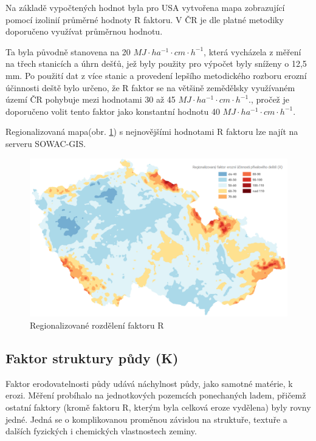 Na základě vypočtených hodnot byla pro USA vytvořena mapa zobrazující pomocí izolinií průměrné hodnoty R faktoru. \cite{usle1978} V ČR je dle platné metodiky doporučeno využívat průměrnou hodnotu.\cite{janecek2012}

Ta byla původně stanovena na 20 $MJ\cdot ha^{-1}\cdot cm \cdot h^{-1}$, která vycházela z měření na třech stanicích a úhrn dešťů, jež byly použity pro výpočet byly sníženy o 12,5 mm. Po použití dat z více stanic a provedení lepšího metodického rozboru erozní účinnosti deště bylo určeno, že R faktor se na většině zemědělsky využívaném území ČR pohybuje mezi hodnotami 30 až 45 $MJ\cdot ha^{-1}\cdot cm \cdot h^{-1}$., pročež je doporučeno volit tento faktor jako konstantní hodnotu 40 $MJ\cdot ha^{-1}\cdot cm \cdot h^{-1}$.\cite{janecek2012}

Regionalizovaná mapa(obr. \ref{fig:r_faktor}) s nejnovějšími hodnotami R faktoru lze najít na serveru SOWAC-GIS.\cite{sowac}

\begin{figure}[H]
    \centering
      \includegraphics[scale=0.5]{./pictures/r_factor.png}
      \caption{Regionalizované rozdělení faktoru R}
      \label{fig:r_faktor}
\end{figure}

\subsection{Faktor struktury půdy (K)}
Faktor erodovatelnosti půdy udává náchylnost půdy, jako samotné matérie, k erozi. Měření probíhalo na jednotkových pozemcích ponechaných ladem, přičemž ostatní faktory (kromě faktoru R, kterým byla celková eroze vydělena) byly rovny jedné. Jedná se o komplikovanou proměnou závislou na struktuře, textuře a dalších fyzických i chemických vlastnostech zeminy.\cite{usle1978}

